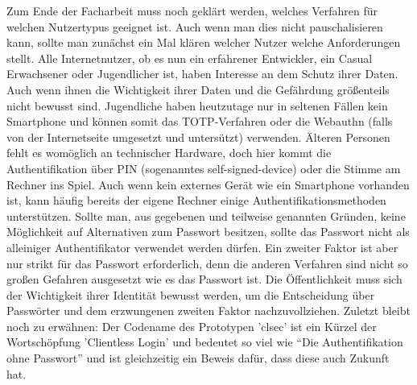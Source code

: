 Zum Ende der Facharbeit muss noch geklärt werden, welches Verfahren für welchen Nutzertypus geeignet ist. Auch wenn man dies nicht pauschalisieren kann, sollte man zunächst ein Mal klären welcher Nutzer welche Anforderungen stellt. Alle Internetnutzer, ob es nun ein erfahrener Entwickler, ein Casual Erwachsener oder Jugendlicher ist, haben Interesse an dem Schutz ihrer Daten. Auch wenn ihnen die Wichtigkeit ihrer Daten und die Gefährdung größenteils nicht bewusst sind. Jugendliche haben heutzutage nur in seltenen Fällen kein Smartphone und können somit das TOTP-Verfahren oder die Webauthn (falls von der Internetseite umgesetzt und untersützt) verwenden. Älteren Personen fehlt es womöglich an technischer Hardware, doch hier kommt die Authentifikation über PIN (sogenanntes self-signed-device) oder die Stimme am Rechner ins Spiel. Auch wenn kein externes Gerät wie ein Smartphone vorhanden ist, kann häufig bereits der eigene Rechner einige Authentifikationsmethoden unterstützen. Sollte man, aus gegebenen und teilweise genannten Gründen, keine Möglichkeit auf Alternativen zum Passwort besitzen, sollte das Passwort nicht als alleiniger Authentifikator verwendet werden dürfen. Ein zweiter Faktor ist aber nur strikt für das Passwort erforderlich, denn die anderen Verfahren sind nicht so großen Gefahren ausgesetzt wie es das Passwort ist. Die Öffentlichkeit muss sich der Wichtigkeit ihrer Identität bewusst werden, um die Entscheidung über Passwörter und dem erzwungenen zweiten Faktor nachzuvollziehen. Zuletzt bleibt noch zu erwähnen: Der Codename des Prototypen 'clsec' ist ein Kürzel der Wortschöpfung 'Clientless Login' und bedeutet so viel wie ``Die Authentifikation ohne Passwort'' und ist gleichzeitig ein Beweis dafür, dass diese auch Zukunft hat.
